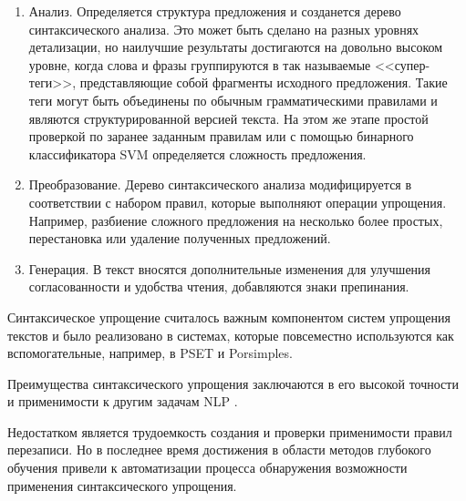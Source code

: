 \begin{enumerate}
	\item Анализ. Определяется структура предложения и созданется дерево синтаксического анализа. Это может быть сделано на разных уровнях детализации, но наилучшие результаты достигаются на довольно высоком уровне, когда слова и фразы группируются в так называемые <<супер-теги>>, представляющие собой фрагменты исходного предложения. Такие теги могут быть объединены по обычным грамматическими правилами и являются структурированной версией текста. На этом же этапе простой проверкой по заранее заданным правилам или с помощью бинарного классификатора SVM\footnotemark{} \cite{shardlow_survey_2014} определяется сложность предложения.
	
	\item Преобразование. Дерево синтаксического анализа модифицируется в соответствии с набором правил, которые выполняют операции упрощения. Например, разбиение сложного предложения на несколько более простых, перестановка или удаление полученных предложений\cite{hutchison_ernesta_2013}.
	
	\item Генерация. В текст вносятся дополнительные изменения для улучшения согласованности и удобства чтения, добавляются знаки препинания.
\end{enumerate}

Синтаксическое упрощение считалось важным компонентом систем упрощения текстов и было реализовано в системах, которые повсеместно используются как вспомогательные, например, в PSET\cite{alva} и Porsimples\cite{aluisio_fostering_2010}.

Преимущества синтаксического упрощения заключаются в его высокой точности и применимости к другим задачам NLP \cite{shardlow_survey_2014}. 

Недостатком является трудоемкость создания и проверки применимости правил перезаписи. Но в последнее время достижения в области методов глубокого обучения привели к автоматизации процесса обнаружения возможности применения синтаксического упрощения.

